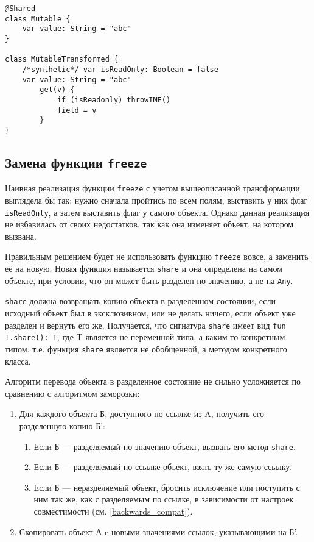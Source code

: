 \documentclass[specification,annotation,times]{itmo-student-thesis}
\begin{document}
\begin{lstlisting}[float=h!,caption={Код до и после трансформации}]
@Shared
class Mutable {
	var value: String = "abc"
}

class MutableTransformed {
	/*synthetic*/ var isReadOnly: Boolean = false
	var value: String = "abc"
		get(v) {
			if (isReadonly) throwIME() 
			field = v
		}
}
\end{lstlisting}

\subsection{Замена функции \texttt{freeze}}

Наивная реализация функции \texttt{freeze} с учетом вышеописанной трансформации выглядела бы так: нужно сначала пройтись по всем полям, выставить у них флаг \texttt{isReadOnly}, а затем выставить флаг у самого объекта.
Однако данная реализация не избавилась от своих недостатков, так как она изменяет объект, на котором вызвана.

Правильным решением будет не использовать функцию \texttt{freeze} вовсе, а заменить её на новую. Новая функция называется \texttt{share} и она определена на самом объекте, при условии, что он может быть разделен по значению, а не на \texttt{Any}.

\texttt{share} должна возвращать копию объекта в разделенном состоянии, если исходный объект был в эксклюзивном, или не делать ничего, если объект уже разделен и вернуть его же.
Получается, что сигнатура \texttt{share} имеет вид \texttt{fun T.share(): T}, где T является не переменной типа, а каким-то конкретным типом, т.е. функция \texttt{share} является не обобщенной, а методом конкретного класса.

Алгоритм перевода объекта в разделенное состояние не сильно усложняется по сравнению с алгоритмом заморозки:

\begin{enumerate}
	\item Для каждого объекта Б, доступного по ссылке из A, получить его разделенную копию Б':
	\begin{enumerate}
		\item Если Б --- разделяемый по значению объект, вызвать его метод \texttt{share}.
		\item Если Б --- разделяемый по ссылке объект, взять ту же самую ссылку.
		\item Если Б --- неразделяемый объект, бросить исключение или поступить с ним так же, как с разделяемым по ссылке, в зависимости от настроек совместимости (см. \ref{backwards_compat}).
	\end{enumerate}
	\item Скопировать объект А c новыми значениями ссылок, указывающими на Б'.
\end{enumerate}
\end{document}
